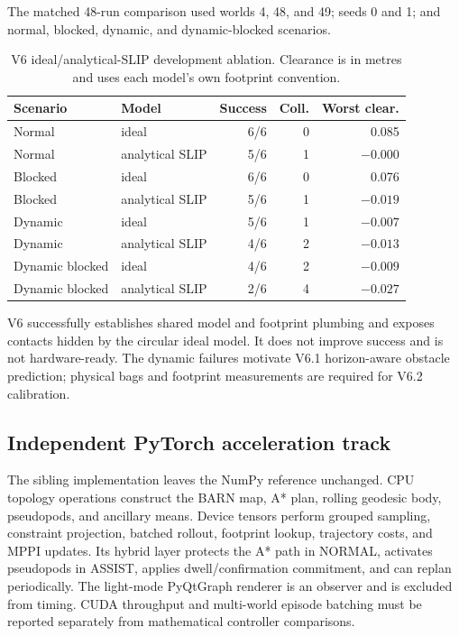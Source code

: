 \documentclass[11pt,a4paper]{article}
\newcommand{\code}[1]{\texttt{\detokenize{#1}}}
\begin{document}
The matched 48-run comparison used worlds 4, 48, and 49; seeds 0 and 1; and
normal, blocked, dynamic, and dynamic-blocked scenarios.
\begin{table}[h]
\centering
\begin{tabular}{llrrr}
\toprule
\textbf{Scenario} & \textbf{Model} & \textbf{Success} & \textbf{Coll.} &
\textbf{Worst clear.} \\
\midrule
Normal & ideal & 6/6 & 0 & 0.085 \\
Normal & analytical SLIP & 5/6 & 1 & $-0.000$ \\
Blocked & ideal & 6/6 & 0 & 0.076 \\
Blocked & analytical SLIP & 5/6 & 1 & $-0.019$ \\
Dynamic & ideal & 5/6 & 1 & $-0.007$ \\
Dynamic & analytical SLIP & 4/6 & 2 & $-0.013$ \\
Dynamic blocked & ideal & 4/6 & 2 & $-0.009$ \\
Dynamic blocked & analytical SLIP & 2/6 & 4 & $-0.027$ \\
\bottomrule
\end{tabular}
\caption{V6 ideal/analytical-SLIP development ablation. Clearance is in
metres and uses each model's own footprint convention.}
\label{tab:v6ablation}
\end{table}

V6 successfully establishes shared model and footprint plumbing and exposes
contacts hidden by the circular ideal model. It does not improve success and
is not hardware-ready. The dynamic failures motivate V6.1 horizon-aware
obstacle prediction; physical bags and footprint measurements are required for
V6.2 calibration.

\subsection{Independent PyTorch acceleration track}

The sibling \code{torch_port} implementation leaves the NumPy reference
unchanged. CPU topology operations construct the BARN map, A* plan, rolling
geodesic body, pseudopods, and ancillary means. Device tensors perform grouped
sampling, constraint projection, batched rollout, footprint lookup, trajectory
costs, and MPPI updates. Its hybrid layer protects the A* path in NORMAL,
activates pseudopods in ASSIST, applies dwell/confirmation commitment, and can
replan periodically. The light-mode PyQtGraph renderer is an observer and is
excluded from timing. CUDA throughput and multi-world episode batching must be
reported separately from mathematical controller comparisons.
\end{document}
